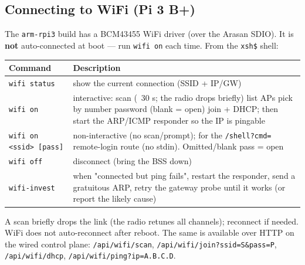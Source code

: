 \documentclass[a4paper,11pt]{article}
\begin{document}
\subsection{Connecting to WiFi (Pi 3 B+)}
The \verb|arm-rpi3| build has a BCM43455 WiFi driver (over the Arasan SDIO). It
is \textbf{not} auto-connected at boot --- run \verb|wifi on| each time. From the
\verb|xsh$| shell:
\begin{center}\footnotesize
\begin{tabular}{@{}l p{9.4cm}@{}}
\toprule \textbf{Command} & \textbf{Description}\\ \midrule
\verb|wifi status| & show the current connection (SSID + IP/GW)\\
\verb|wifi on| & interactive: scan (~30 s; the radio drops briefly) \textrightarrow{} list APs \textrightarrow{} pick by number \textrightarrow{} password (blank = open) \textrightarrow{} join + DHCP; then start the ARP/ICMP responder so the IP is pingable\\
\verb|wifi on <ssid> [pass]| & non-interactive (no scan/prompt); for the \verb|/shell?cmd=| remote-login route (no stdin). Omitted/blank pass = open\\
\verb|wifi off| & disconnect (bring the BSS down)\\
\verb|wifi-invest| & when "connected but ping fails", restart the responder, send a gratuitous ARP, retry the gateway probe until it works (or report the likely cause)\\
\bottomrule
\end{tabular}
\end{center}
A scan briefly drops the link (the radio retunes all channels); reconnect if
needed. WiFi does not auto-reconnect after reboot. The same is available over
HTTP on the wired control plane: \verb|/api/wifi/scan|,
\verb|/api/wifi/join?ssid=S&pass=P|, \verb|/api/wifi/dhcp|,
\verb|/api/wifi/ping?ip=A.B.C.D|.
\end{document}

